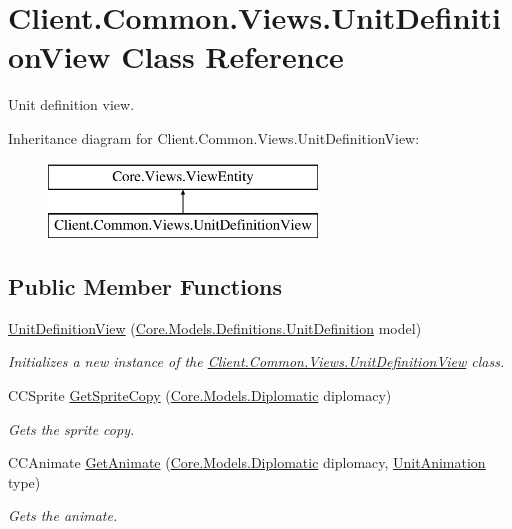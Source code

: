 \hypertarget{classClient_1_1Common_1_1Views_1_1UnitDefinitionView}{}\section{Client.\+Common.\+Views.\+Unit\+Definition\+View Class Reference}
\label{classClient_1_1Common_1_1Views_1_1UnitDefinitionView}


Unit definition view.  


Inheritance diagram for Client.\+Common.\+Views.\+Unit\+Definition\+View\+:\begin{figure}[H]
\begin{center}
\leavevmode
\includegraphics[height=2.000000cm]{classClient_1_1Common_1_1Views_1_1UnitDefinitionView}
\end{center}
\end{figure}
\subsection*{Public Member Functions}
\begin{DoxyCompactItemize}
\item 
\hyperlink{classClient_1_1Common_1_1Views_1_1UnitDefinitionView_aa876eb4bab188a8b31eb1e27e674cb4a}{Unit\+Definition\+View} (\hyperlink{classCore_1_1Models_1_1Definitions_1_1UnitDefinition}{Core.\+Models.\+Definitions.\+Unit\+Definition} model)
\begin{DoxyCompactList}\small\item\em Initializes a new instance of the \hyperlink{classClient_1_1Common_1_1Views_1_1UnitDefinitionView}{Client.\+Common.\+Views.\+Unit\+Definition\+View} class. \end{DoxyCompactList}\item 
C\+C\+Sprite \hyperlink{classClient_1_1Common_1_1Views_1_1UnitDefinitionView_ae95f1083e6697658aaf51d3e8003b16b}{Get\+Sprite\+Copy} (\hyperlink{namespaceCore_1_1Models_ada607f76afbafc59695c90fc5a7093a2}{Core.\+Models.\+Diplomatic} diplomacy)
\begin{DoxyCompactList}\small\item\em Gets the sprite copy. \end{DoxyCompactList}\item 
C\+C\+Animate \hyperlink{classClient_1_1Common_1_1Views_1_1UnitDefinitionView_ac38f5714c700e4e04e64b551bd2d16ba}{Get\+Animate} (\hyperlink{namespaceCore_1_1Models_ada607f76afbafc59695c90fc5a7093a2}{Core.\+Models.\+Diplomatic} diplomacy, \hyperlink{namespaceClient_1_1Common_1_1Views_a6974b9f5798be7fa135e7517fa41ffe0}{Unit\+Animation} type)
\begin{DoxyCompactList}\small\item\em Gets the animate. \end{DoxyCompactList}\end{DoxyCompactItemize}
